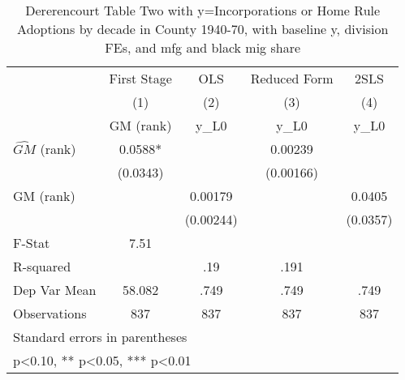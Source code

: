 \begin{table}[htbp]\centering
\def\sym#1{\ifmmode^{#1}\else\(^{#1}\)\fi}
\caption{Dererencourt Table Two with y=Incorporations or Home Rule Adoptions by decade in County 1940-70, with baseline y, division FEs, and mfg and black mig share}
\begin{tabular}{l*{4}{c}}
\toprule
                    & First Stage   &         OLS   &Reduced Form   &        2SLS   \\
                    &\multicolumn{1}{c}{(1)}&\multicolumn{1}{c}{(2)}&\multicolumn{1}{c}{(3)}&\multicolumn{1}{c}{(4)}\\
                    &\multicolumn{1}{c}{GM  (rank)}&\multicolumn{1}{c}{y\_L0}&\multicolumn{1}{c}{y\_L0}&\multicolumn{1}{c}{y\_L0}\\
\midrule
$\hat{GM}$ (rank)   &      0.0588*  &               &     0.00239   &               \\
                    &    (0.0343)   &               &   (0.00166)   &               \\
\addlinespace
GM  (rank)          &               &     0.00179   &               &      0.0405   \\
                    &               &   (0.00244)   &               &    (0.0357)   \\
\midrule
F-Stat              &        7.51   &               &               &               \\
R-squared           &               &         .19   &        .191   &               \\
Dep Var Mean        &      58.082   &        .749   &        .749   &        .749   \\
Observations        &         837   &         837   &         837   &         837   \\
\bottomrule
\multicolumn{5}{l}{\footnotesize Standard errors in parentheses}\\
\multicolumn{5}{l}{\footnotesize * p<0.10, ** p<0.05, *** p<0.01}\\
\end{tabular}
\end{table}
